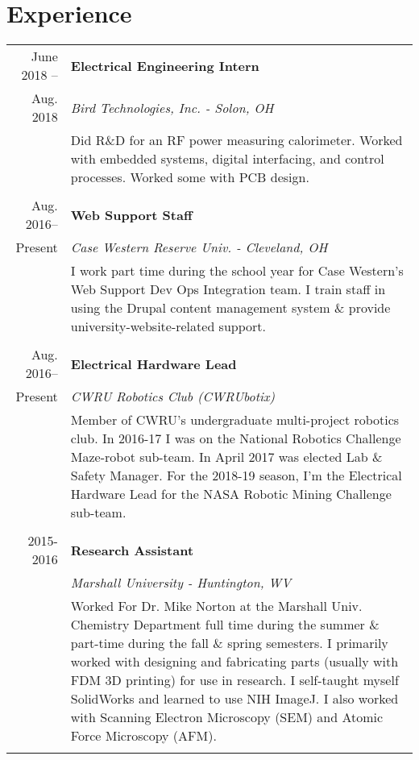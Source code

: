 \documentclass[a4paper,10pt]{article}
\begin{document}
\section{Experience}\vspace{-1mm}
\begin{tabular}{r|p{14cm}}
June 2018 -- 		& \textbf{Electrical Engineering Intern}\\
Aug. 2018 			& \textit{Bird Technologies, Inc. - Solon, OH}\\
 				& \footnotesize{Did R\&D for an RF power measuring calorimeter. Worked with embedded systems, digital interfacing, and control processes. Worked some with PCB design. }\\
\multicolumn{2}{c}{} \vspace{-2mm}\\
{Aug. 2016--}		& \textbf{Web Support Staff}\\
{Present}			& \textit{Case Western Reserve Univ. - Cleveland, OH} \\
				&\footnotesize{I work part time during the school year for Case Western's Web Support Dev Ops Integration team. I train staff in using the Drupal content management system \& provide university-website-related support.}\\
\multicolumn{2}{c}{} \vspace{-2mm}\\
{Aug. 2016--}		& \textbf{Electrical Hardware Lead }\\
{Present}			& \textit{CWRU Robotics Club (CWRUbotix)}\\
				& \footnotesize{Member of CWRU's undergraduate multi-project robotics club. In 2016-17 I was on the National Robotics Challenge Maze-robot sub-team. In April 2017 was elected Lab \& Safety Manager. For the 2018-19 season, I'm the Electrical Hardware Lead for the NASA Robotic Mining Challenge sub-team.}\\
\multicolumn{2}{c}{} \vspace{-2mm} \\

 \textsc{2015-2016} 	& \textbf{Research Assistant}\\
				& \textit{Marshall University - Huntington, WV}\\
				&\footnotesize{Worked For Dr. Mike Norton at the Marshall Univ. Chemistry Department full time during the summer \& part-time during the fall \& spring semesters. I primarily worked with designing and fabricating parts (usually with FDM 3D printing) for use in research. I self-taught myself SolidWorks and learned to use NIH ImageJ. I also worked with Scanning Electron Microscopy (SEM) and Atomic Force Microscopy (AFM).}\\
\multicolumn{2}{c}{}\vspace{-2mm} \\


\end{tabular}
\end{document}
